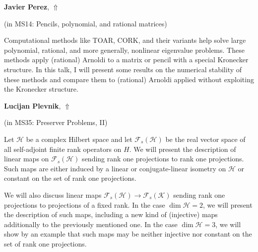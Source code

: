 \documentclass[ILAS2025-program.tex]{subfiles}
\begin{document}
\hypertarget{down0328}{}\begin{ilasabstract}
    
\textbf{Javier Perez},  \hfill \hyperlink{up0328}{$\Uparrow$}
    
    
(in {\color{mstitle}MS14: Pencils, polynomial, and rational matrices})
        
\mtskip
    Computational methods like TOAR, CORK, and their variants help solve large polynomial, rational, and more generally, nonlinear eigenvalue problems. 
These methods apply (rational) Arnoldi to a matrix or pencil with a special Kronecker structure.
In this talk, I will present some results on the numerical stability of these methods and compare them to  (rational) Arnoldi applied without exploiting the Kronecker structure.
\end{ilasabstract}
    

\hypertarget{down0280}{}\begin{ilasabstract}
    
\textbf{Lucijan Plevnik},  \hfill \hyperlink{up0280}{$\Uparrow$}
    
    
(in {\color{mstitle}MS35: Preserver Problems, II})
        
\mtskip
    Let $\mathcal H$ be a complex Hilbert space and let ${\mathcal F}_{s}(\mathcal H)$ be the real vector space of all self-adjoint finite rank operators on $H$.
We will present the description of linear maps on ${\mathcal F}_{s}(\mathcal H)$ sending rank one projections to rank one projections.
Such maps are either induced by a linear or conjugate-linear isometry on $\mathcal H$ or constant on the set of rank one projections.

We will also discuss linear maps ${\mathcal F}_{s}(\mathcal H) \to {\mathcal F}_{s}(\mathcal K)$ sending rank one projections to projections of a fixed rank.
In the case $\dim \mathcal H = 2$, we will present the description of such maps, including a new kind of (injective) maps additionally to the previously mentioned one.
In the case $\dim \mathcal H = 3$, we will show by an example that such maps may be neither injective nor constant on the set of rank one projections.

\end{ilasabstract}
    
\end{document}
